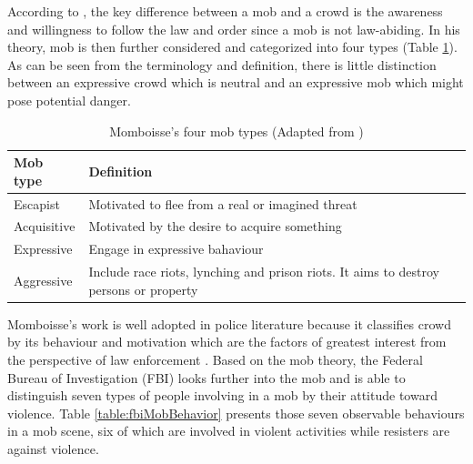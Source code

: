 According to \citet{Momboisse1967}, the key difference between a mob and a crowd is the awareness and willingness to follow the law and order since a mob is not law-abiding. In his theory, mob is then further considered and categorized into four types (Table \ref{table:momboisseMobType}). As can be seen from the terminology and definition, there is little distinction between an expressive crowd which is neutral and an expressive mob which might pose potential danger.

\begin{table}
	\caption{Momboisse's four mob types (Adapted from \citet{Schweingruber2000})}
	\label{table:momboisseMobType}
	\centering
	\begin{tabular}{|l|p{10cm}|}
		\hline
		\textbf{Mob type} & \textbf{Definition} \\
		\hline
		Escapist & Motivated to flee from a real or imagined threat \\
		\hline
		Acquisitive &  Motivated by the desire to acquire something \\
		\hline
		Expressive & Engage in expressive bahaviour \\
		\hline
		Aggressive & Include race riots, lynching and prison riots. It aims to destroy persons or property \\
		\hline
	\end{tabular}
\end{table}


Momboisse’s work is well adopted in police literature because it classifies crowd by its behaviour and motivation which are the factors of greatest interest from the perspective of law enforcement \citep{FBI1967}. Based on the mob theory, the Federal Bureau of Investigation (FBI) looks further into the mob and is able to distinguish seven types of people involving in a mob by their attitude toward violence. Table \ref{table:fbiMobBehavior} presents those seven observable behaviours in a mob scene, six of which are involved in violent activities while resisters are against violence.

